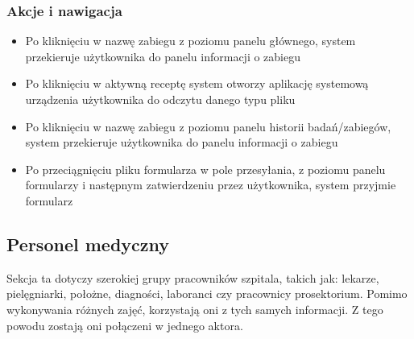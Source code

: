 \subsubsection{Akcje i nawigacja}
\begin{itemize}
    \item Po kliknięciu w nazwę zabiegu z poziomu panelu głównego, system przekieruje użytkownika do panelu informacji o zabiegu
    \item Po kliknięciu w aktywną receptę system otworzy aplikację systemową urządzenia użytkownika do odczytu danego typu pliku 
    \item Po kliknięciu w nazwę zabiegu z poziomu panelu historii badań/zabiegów, system przekieruje użytkownika do panelu informacji o zabiegu
    \item Po przeciągnięciu pliku formularza w pole przesyłania, z poziomu panelu formularzy i następnym zatwierdzeniu przez użytkownika, system przyjmie formularz
\end{itemize}
\subsection{Personel medyczny}
Sekcja ta dotyczy szerokiej grupy pracowników szpitala, takich jak: lekarze, pielęgniarki, położne, diagności, laboranci czy pracownicy prosektorium. Pomimo wykonywania różnych zajęć, korzystają oni z tych samych informacji. Z tego powodu zostają oni połączeni w jednego aktora.
